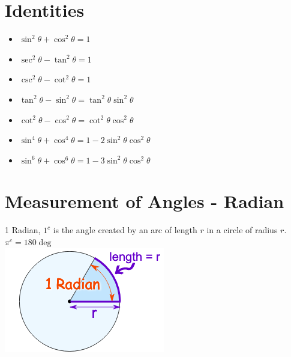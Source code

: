 \documentclass{book}
\begin{document}
	 \section{Identities}
	 \begin{mdframed}[backgroundcolor=yellow]
		\begin{itemize}
			\item $\sin^2\theta + \cos^2\theta = 1$
			\item $\sec^2\theta - \tan^2\theta = 1$
			\item $\csc^2\theta - \cot^2\theta = 1$
			\item $\tan^2\theta - \sin^2\theta = \tan^2\theta\sin^2\theta$
			\item $\cot^2\theta - \cos^2\theta = \cot^2\theta\cos^2\theta$
			\item $\sin^4\theta + \cos^4\theta = 1-2\sin^2\theta\cos^2\theta$
			\item $\sin^6\theta + \cos^6\theta = 1 -3\sin^2\theta\cos^2\theta$
		\end{itemize}
	 \end{mdframed}
	 
	 \section{Measurement of Angles - Radian}
	 1 Radian, $1^c$ is the angle created by an arc of length $r$ in a circle of radius $r$. \\
	 $\pi^c = 180\deg$ \\
	 
	\includegraphics[scale=0.6]{radians} \\ \\ \\
	 
\end{document}
